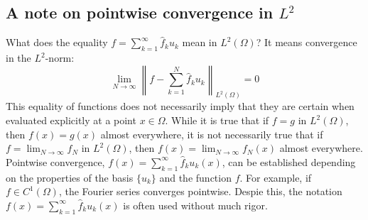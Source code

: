\subsection*{A note on pointwise convergence in $L^2$}
What does the equality $f=\sum_{k=1}^{\infty}\hat{f}_{k}u_{k}$ mean in $L^{2}(\Omega)$?  It means convergence in the $L^2$-norm:
\begin{equation*}
    \lim_{N\rightarrow\infty}\left\|f-\sum_{k=1}^{N}\hat{f}_{k}u_{k}\right\|_{L^{2}(\Omega)}=0
\end{equation*}
This equality of functions does not necessarily imply that they are certain when evaluated explicitly at a point $x\in\Omega$. While it is true that if $f=g$ in $L^{2}(\Omega)$, then $f(x)=g(x)$ almost everywhere, it is not necessarily true that if $f=\lim_{N\rightarrow\infty}f_{N}$ in $L^{2}(\Omega)$, then $f(x)=\lim_{N\rightarrow\infty}f_{N}(x)$ almost everywhere. Pointwise convergence, $f(x)=\sum_{k=1}^{\infty}\hat{f}_{k}u_{k}(x)$, can be established depending on the properties of the basis $\{u_k\}$ and the function $f$. For example, if $f\in C^{1}(\Omega)$, the Fourier series converges pointwise. Despie this, the notation $f(x)=\sum_{k=1}^{\infty}\hat{f}_{k}u_{k}(x)$ is often used without much rigor.

